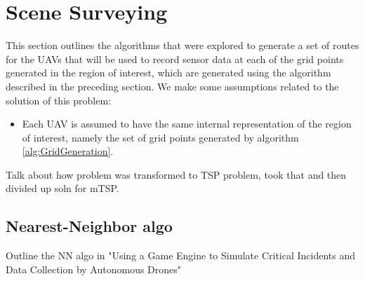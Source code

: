 

\section{Scene Surveying}
This section outlines the algorithms that were explored to generate a set of routes for the UAVs that will be used to record sensor data at each of the grid points generated in the region of interest, which are generated using the algorithm described in the preceding section. We make some assumptions related to the solution of this problem:
\begin{itemize}
    \item Each UAV is assumed to have the same internal representation of the region of interest, namely the set of grid points generated by algorithm \ref{alg:GridGeneration}.
\end{itemize}

Talk about how problem was transformed to TSP problem, took that and then divided up soln for mTSP.

\subsection{Nearest-Neighbor algo}
Outline the NN algo in "Using a Game Engine to Simulate Critical Incidents
and Data Collection by Autonomous Drones"

\subsubsection{}